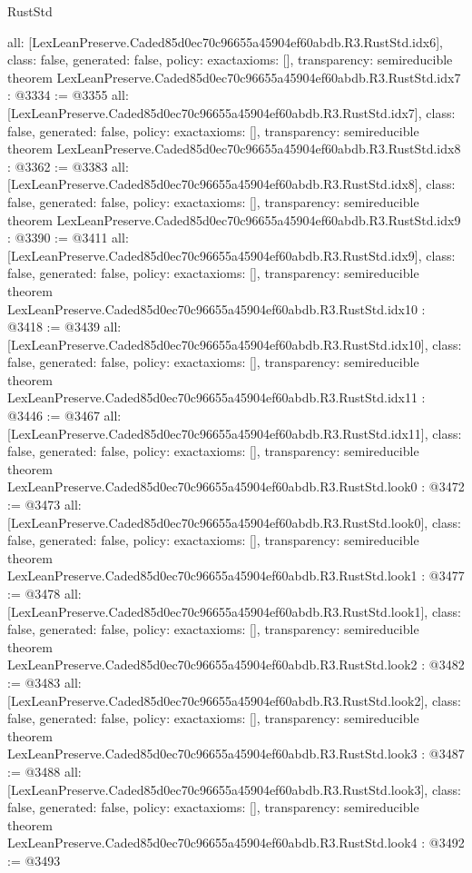 \begin{lexlean}{RustStd}
\begin{coremodule}
{  all: [LexLeanPreserve.Caded85d0ec70c96655a45904ef60abdb.R3.RustStd.idx6],
  class: false,
  generated: false,
  policy: exact{axioms: []},
  transparency: semireducible
}
theorem LexLeanPreserve.Caded85d0ec70c96655a45904ef60abdb.R3.RustStd.idx7 : @3334 := @3355 {
  all: [LexLeanPreserve.Caded85d0ec70c96655a45904ef60abdb.R3.RustStd.idx7],
  class: false,
  generated: false,
  policy: exact{axioms: []},
  transparency: semireducible
}
theorem LexLeanPreserve.Caded85d0ec70c96655a45904ef60abdb.R3.RustStd.idx8 : @3362 := @3383 {
  all: [LexLeanPreserve.Caded85d0ec70c96655a45904ef60abdb.R3.RustStd.idx8],
  class: false,
  generated: false,
  policy: exact{axioms: []},
  transparency: semireducible
}
theorem LexLeanPreserve.Caded85d0ec70c96655a45904ef60abdb.R3.RustStd.idx9 : @3390 := @3411 {
  all: [LexLeanPreserve.Caded85d0ec70c96655a45904ef60abdb.R3.RustStd.idx9],
  class: false,
  generated: false,
  policy: exact{axioms: []},
  transparency: semireducible
}
theorem LexLeanPreserve.Caded85d0ec70c96655a45904ef60abdb.R3.RustStd.idx10 : @3418 := @3439 {
  all: [LexLeanPreserve.Caded85d0ec70c96655a45904ef60abdb.R3.RustStd.idx10],
  class: false,
  generated: false,
  policy: exact{axioms: []},
  transparency: semireducible
}
theorem LexLeanPreserve.Caded85d0ec70c96655a45904ef60abdb.R3.RustStd.idx11 : @3446 := @3467 {
  all: [LexLeanPreserve.Caded85d0ec70c96655a45904ef60abdb.R3.RustStd.idx11],
  class: false,
  generated: false,
  policy: exact{axioms: []},
  transparency: semireducible
}
theorem LexLeanPreserve.Caded85d0ec70c96655a45904ef60abdb.R3.RustStd.look0 : @3472 := @3473 {
  all: [LexLeanPreserve.Caded85d0ec70c96655a45904ef60abdb.R3.RustStd.look0],
  class: false,
  generated: false,
  policy: exact{axioms: []},
  transparency: semireducible
}
theorem LexLeanPreserve.Caded85d0ec70c96655a45904ef60abdb.R3.RustStd.look1 : @3477 := @3478 {
  all: [LexLeanPreserve.Caded85d0ec70c96655a45904ef60abdb.R3.RustStd.look1],
  class: false,
  generated: false,
  policy: exact{axioms: []},
  transparency: semireducible
}
theorem LexLeanPreserve.Caded85d0ec70c96655a45904ef60abdb.R3.RustStd.look2 : @3482 := @3483 {
  all: [LexLeanPreserve.Caded85d0ec70c96655a45904ef60abdb.R3.RustStd.look2],
  class: false,
  generated: false,
  policy: exact{axioms: []},
  transparency: semireducible
}
theorem LexLeanPreserve.Caded85d0ec70c96655a45904ef60abdb.R3.RustStd.look3 : @3487 := @3488 {
  all: [LexLeanPreserve.Caded85d0ec70c96655a45904ef60abdb.R3.RustStd.look3],
  class: false,
  generated: false,
  policy: exact{axioms: []},
  transparency: semireducible
}
theorem LexLeanPreserve.Caded85d0ec70c96655a45904ef60abdb.R3.RustStd.look4 : @3492 := @3493 {
}
\end{coremodule}
\end{lexlean}
